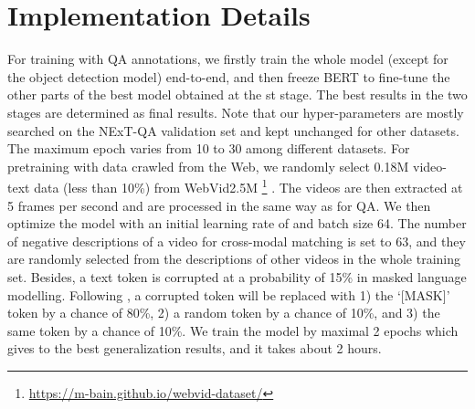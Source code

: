 \documentclass[runningheads]{llncs}
\begin{document}
\setlength{\tabcolsep}{2.3pt}
\begin{table*}[t!]
\small
\centering
\caption{Data statistics. OE: Open-Ended QA. MC: Multi-Choice QA, VLen (s): Average video length in seconds.}
\vspace{-0.8em}
\begin{threeparttable}
    \vspace{-0.5cm}
\label{tab:dataset}
\end{threeparttable}
\end{table*}

\section{Implementation Details}
\label{app:imp}
For training with QA annotations, we firstly train the whole model (except for the object detection model) end-to-end, and then freeze BERT to fine-tune the other parts of the best model obtained at the st stage. The best results in the two stages are determined as final results. Note that our hyper-parameters are mostly searched on the NExT-QA validation set and kept unchanged for other datasets. The maximum epoch varies from 10 to 30 among different datasets. For pretraining with data crawled from the Web, we randomly select 0.18M video-text data (less than 10\%) from WebVid2.5M
\footnote{\url{https://m-bain.github.io/webvid-dataset/}}
\cite{bain2021frozen}. The videos are then extracted at 5 frames per second and are processed in the same way as for QA. We then optimize the model with an initial learning rate of  and batch size 64. The number of negative descriptions of a video for cross-modal matching is set to 63, and they are randomly selected from the descriptions of other videos in the whole training set. Besides, a text token is corrupted at a probability of 15\% in masked language modelling. Following \cite{yang2021just}, a corrupted token will be replaced with 1) the `[MASK]' token by a chance of 80\%, 2) a random token by a chance of 10\%, and 3) the same token by a chance of 10\%. We train the model by maximal 2 epochs which gives to the best generalization results, and it takes about 2 hours.
\end{document}

